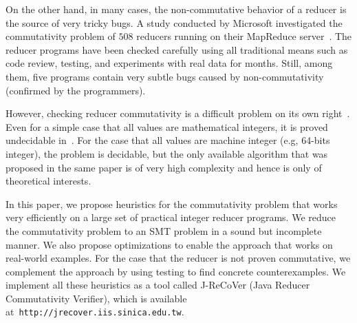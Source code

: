 \documentclass{llncs}
\newcommand{\hide}[1]{}
\begin{document}
\hide{More concretely, for the verification of a MapReduce program, we propose to do it in two phases. First, ensuring if all reducers are commutative. If some reducers are non-commutative, modifying them to commutative ones. Usually, the modification is not a difficult task~\cite{xiao14mr}, and can be done without affecting their functionality and performance. For example, assume that the task of a reducer is to find the name of the person with highest score. Such a reducer is non-commutative when the input include two people with the same highest score. This reducer can be made commutative, by also comparing the ID number of people with the same score. Once all reducers are made commutative, we reduce the verification problem to sequential verification by fixing a scheduler. In this two-phase approach, the key enabling technique is an efficient procedure for checking reducer commutativity.}

On the other hand, in many cases, the non-commutative behavior of a reducer is the source of very tricky bugs. A study conducted by Microsoft investigated the commutativity problem of $508$ reducers running on their MapReduce server~\cite{xiao14mr}. The reducer programs have been checked carefully using all traditional means such as code review, testing, and experiments with real data for months. Still, among them, five programs contain very subtle bugs caused by non-commutativity (confirmed by the programmers).

However, checking reducer commutativity is a difficult problem on its own right~\cite{ChenHSW15,ChenSW16,ChenLTW17}. Even for a simple case that all values are mathematical integers, it is proved undecidable in~\cite{ChenHSW15}. For the case that all values are machine integer (e.g, 64-bits integer), the problem is decidable, but the only available algorithm that was proposed in the same paper is of very high complexity and hence is only of theoretical interests.

In this paper, we propose heuristics for the commutativity problem that works very efficiently on a large set of practical integer reducer programs. We reduce the commutativity problem to an SMT problem in a sound but incomplete manner. We also propose optimizations to enable the approach that works on real-world examples. For the case that the reducer is not proven commutative, we complement the approach by using testing to find concrete counterexamples. We implement all these heuristics as a tool called J-ReCoVer (Java Reducer Commutativity Verifier), which is available at~\verb|http://jrecover.iis.sinica.edu.tw|.
\end{document}
